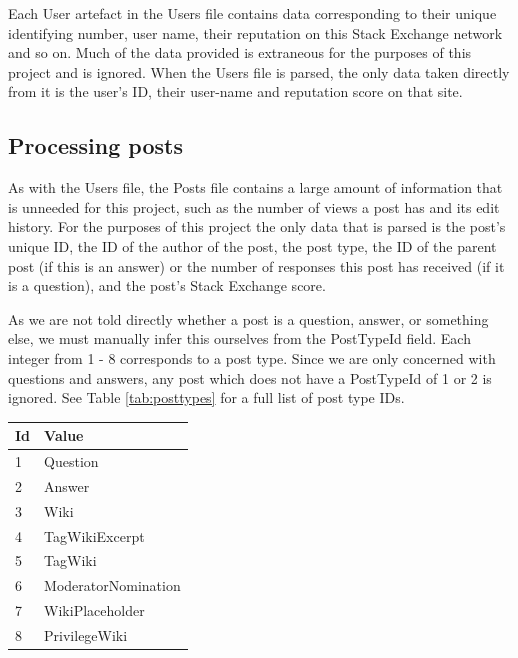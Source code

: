 \documentclass[]{final_report}
\begin{document}
Each User artefact in the Users file contains data corresponding to their unique identifying number, user name, their reputation on this Stack Exchange network and so on. Much of the data provided is extraneous for the purposes of this project and is ignored. When the Users file is parsed, the only data taken directly from it is the user's ID, their user-name and reputation score on that site.

\subsection{Processing posts}

As with the Users file, the Posts file contains a large amount of information that is unneeded for this project, such as the number of views a post has and its edit history. For the purposes of this project the only data that is parsed is the post's unique ID, the ID of the author of the post, the post type, the ID of the parent post (if this is an answer) or the number of responses this post has received (if it is a question), and the post's Stack Exchange score.

As we are not told directly whether a post is a question, answer, or something else, we must manually infer this ourselves from the PostTypeId field. Each integer from 1 - 8 corresponds to a post type. Since we are only concerned with questions and answers, any post which does not have a PostTypeId of 1 or 2 is ignored. See Table \ref{tab:posttypes} for a full list of post type IDs.

\begin{minipage}{\linewidth}
\centering
\begin{tabular}{|l|l|}
\hline \textbf{Id} & \textbf{Value} \\ 
\hline 1 & Question \\ 
\hline 2 & Answer \\ 
\hline 3 & Wiki \\ 
\hline 4 & TagWikiExcerpt \\ 
\hline 5 & TagWiki \\ 
\hline 6 & ModeratorNomination \\ 
\hline 7 & WikiPlaceholder \\ 
\hline 8 & PrivilegeWiki \\
\hline 
\end{tabular}\par
{} \label{tab:posttypes}
\end{minipage}
\end{document}
